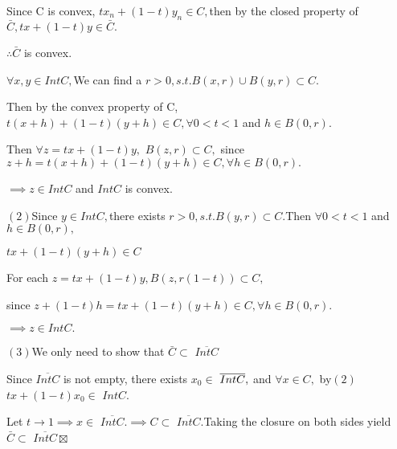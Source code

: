 \documentclass{article}
\begin{document}
Since C is convex, $tx_{n}+\left( 1-t\right) y_{n}\in C,$then by the closed
property of $\bar{C},tx+\left( 1-t\right) y\in \bar{C}.$

$\therefore \bar{C}$ is convex.

$\forall x,y\in IntC,$We can find a $r>0,s.t.B\left( x,r\right) \cup B\left(
y,r\right) \subset C.$

Then by the convex property of C, $t\left( x+h\right) +\left( 1-t\right)
\left( y+h\right) \in C,\forall 0<t<1$ and $h\in B\left( 0,r\right) .$

Then $\forall z=tx+\left( 1-t\right) y,$ $B\left( z,r\right) \subset C,$%
since $z+h=t\left( x+h\right) +\left( 1-t\right) \left( y+h\right) \in
C,\forall h\in B\left( 0,r\right) .$

$\implies z\in IntC$ and $IntC$ is convex.

$\left( 2\right) $Since $y\in IntC,$there exists $r>0,s.t.B\left( y,r\right)
\subset C.$Then $\forall 0<t<1$ and $h\in B\left( 0,r\right) ,$

$tx+\left( 1-t\right) \left( y+h\right) \in C$

For each $z=tx+\left( 1-t\right) y,B\left( z,r\left( 1-t\right) \right)
\subset C,$

since $z+\left( 1-t\right) h=tx+\left( 1-t\right) \left( y+h\right) \in
C,\forall h\in B\left( 0,r\right) .$

$\implies z\in IntC.$

$\left( 3\right) $We only need to show that $\bar{C}\subset $ $\overline{IntC%
}$

Since  $\overline{IntC}$ is not empty, there exists $x_{0}\in $ $\overline{%
IntC},$ and $\forall x\in C,$ by$\left( 2\right) $ $tx+\left( 1-t\right)
x_{0}\in $ $IntC.$

Let $t\rightarrow 1\implies x\in $ $\overline{IntC}.\implies C\subset $ $%
\overline{IntC}.$Taking the closure on both sides yield $\bar{C}\subset $ $%
\overline{IntC}\boxtimes $ 
\end{document}
